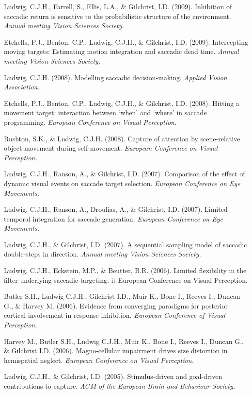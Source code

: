 \documentclass[a4paper, 10pt]{article}
\renewenvironment{itemize}{
  \begin{list}{}{
    \setlength{\leftmargin}{1.5em}
  }
}{
  \end{list}
}
\begin{document}
\begin{itemize}
\item Ludwig, C.J.H., Farrell, S., Ellis, L.A., \& Gilchrist, I.D. (2009). Inhibition of saccadic return is sensitive to the probabilistic
      structure of the environment. {\it Annual meeting Vision Sciences Society.}
\item Etchells, P.J., Benton, C.P., Ludwig, C.J.H., \& Gilchrist, I.D. (2009). Intercepting moving targets: Estimating motion integration
      and saccadic dead time. {\it Annual meeting Vision Sciences Society.}
\item Ludwig, C.J.H. (2008). Modelling saccadic decision-making. {\it Applied Vision Association.}
\item Etchells, P.J., Benton, C.P., Ludwig, C.J.H., \& Gilchrist, I.D. (2008). Hitting a movement target: interaction between `when' and `where' in saccade programming. {\it European Conference on Visual Perception.}
\item Rushton, S.K., \& Ludwig, C.J.H. (2008). Capture of attention by scene-relative object movement during self-movement. {\it European Conference on Visual Perception.}
\item Ludwig, C.J.H., Ranson, A., \& Gilchrist, I.D. (2007). Comparison of the effect of dynamic visual events on saccade target selection. {\it European Conference on Eye Movements.}
\item Ludwig, C.J.H., Ranson, A., Droulias, A., \& Gilchrist, I.D. (2007). Limited temporal integration for saccade generation. {\it European Conference on Eye Movements.}
\item Ludwig, C.J.H., \& Gilchrist, I.D. (2007). A sequential sampling model of saccadic double-steps in direction. {\it Annual meeting Vision Sciences Society.}
\item Ludwig, C.J.H., Eckstein, M.P., \& Beutter, B.R. (2006). Limited flexibility in the filter underlying saccadic targeting. {it European Conference on Visual Perception.}
\item Butler S.H., Ludwig C.J.H., Gilchrist I.D., Muir K., Bone I., Reeves I., Duncan G., \& Harvey M. (2006). Evidence from converging paradigms for posterior cortical involvement in response inhibition. {\it European Conference of Visual Perception.}
\item Harvey M., Butler S.H., Ludwig C.J.H., Muir K., Bone I., Reeves I., Duncan G., \& Gilchrist I.D. (2006). Magno-cellular impairment drives size distortion in hemispatial neglect. {\it European Conference on Visual Perception.}
\item Ludwig, C.J.H., \& Gilchrist, I.D. (2005). Stimulus-driven and goal-driven contributions to capture. {\it AGM of the European Brain and Behaviour Society.}

\end{itemize}
\end{document}
